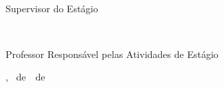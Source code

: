 \begin{flushright}%
	\begin{minipage}{0.5\textwidth}%
		\@supervisor\\\vspace{-0.5cm}
		\begin{flushright}
			Supervisor do Estágio
		\end{flushright}		
	\end{minipage}
\end{flushright}

\vspace{2\baselineskip plus 1.5\baselineskip minus 0.5\baselineskip}

\begin{flushright}%
	\begin{minipage}{0.5\textwidth}%
		\@prae\\\vspace{-0.5cm}
		\begin{flushright}
			Professor Responsável pelas Atividades de Estágio
		\end{flushright}		
	\end{minipage}
\end{flushright}

\vfill%
\begin{center}
	\@cidade, \@diaDefesa~de~\@mesDefesa~de~\anovalor
\end{center}

\restoregeometry %